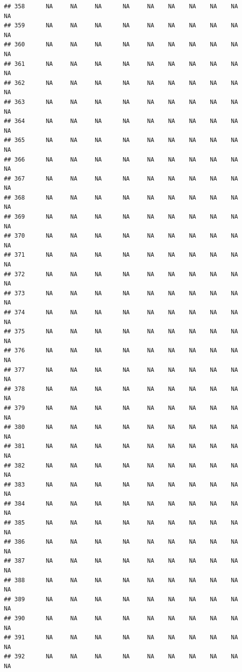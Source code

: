 \documentclass{article}\usepackage{graphicx, color}
\makeatletter
\newenvironment{kframe}{%
 \def\at@end@of@kframe{}%
 \ifinner\ifhmode%
  \def\at@end@of@kframe{\end{minipage}}%
  \begin{minipage}{\columnwidth}%
 \fi\fi%
 \def\FrameCommand##1{\hskip\@totalleftmargin \hskip-\fboxsep
 \colorbox{shadecolor}{##1}\hskip-\fboxsep
     \hskip-\linewidth \hskip-\@totalleftmargin \hskip\columnwidth}%
 \MakeFramed {\advance\hsize-\width
   \@totalleftmargin\z@ \linewidth\hsize
   \@setminipage}}%
 {\par\unskip\endMakeFramed%
 \at@end@of@kframe}
\newenvironment{knitrout}{}{} %
\makeatother
\begin{document}
\begin{knitrout}
\begin{kframe}
\begin{verbatim}
## 358      NA     NA     NA      NA     NA    NA    NA    NA    NA     NA
## 359      NA     NA     NA      NA     NA    NA    NA    NA    NA     NA
## 360      NA     NA     NA      NA     NA    NA    NA    NA    NA     NA
## 361      NA     NA     NA      NA     NA    NA    NA    NA    NA     NA
## 362      NA     NA     NA      NA     NA    NA    NA    NA    NA     NA
## 363      NA     NA     NA      NA     NA    NA    NA    NA    NA     NA
## 364      NA     NA     NA      NA     NA    NA    NA    NA    NA     NA
## 365      NA     NA     NA      NA     NA    NA    NA    NA    NA     NA
## 366      NA     NA     NA      NA     NA    NA    NA    NA    NA     NA
## 367      NA     NA     NA      NA     NA    NA    NA    NA    NA     NA
## 368      NA     NA     NA      NA     NA    NA    NA    NA    NA     NA
## 369      NA     NA     NA      NA     NA    NA    NA    NA    NA     NA
## 370      NA     NA     NA      NA     NA    NA    NA    NA    NA     NA
## 371      NA     NA     NA      NA     NA    NA    NA    NA    NA     NA
## 372      NA     NA     NA      NA     NA    NA    NA    NA    NA     NA
## 373      NA     NA     NA      NA     NA    NA    NA    NA    NA     NA
## 374      NA     NA     NA      NA     NA    NA    NA    NA    NA     NA
## 375      NA     NA     NA      NA     NA    NA    NA    NA    NA     NA
## 376      NA     NA     NA      NA     NA    NA    NA    NA    NA     NA
## 377      NA     NA     NA      NA     NA    NA    NA    NA    NA     NA
## 378      NA     NA     NA      NA     NA    NA    NA    NA    NA     NA
## 379      NA     NA     NA      NA     NA    NA    NA    NA    NA     NA
## 380      NA     NA     NA      NA     NA    NA    NA    NA    NA     NA
## 381      NA     NA     NA      NA     NA    NA    NA    NA    NA     NA
## 382      NA     NA     NA      NA     NA    NA    NA    NA    NA     NA
## 383      NA     NA     NA      NA     NA    NA    NA    NA    NA     NA
## 384      NA     NA     NA      NA     NA    NA    NA    NA    NA     NA
## 385      NA     NA     NA      NA     NA    NA    NA    NA    NA     NA
## 386      NA     NA     NA      NA     NA    NA    NA    NA    NA     NA
## 387      NA     NA     NA      NA     NA    NA    NA    NA    NA     NA
## 388      NA     NA     NA      NA     NA    NA    NA    NA    NA     NA
## 389      NA     NA     NA      NA     NA    NA    NA    NA    NA     NA
## 390      NA     NA     NA      NA     NA    NA    NA    NA    NA     NA
## 391      NA     NA     NA      NA     NA    NA    NA    NA    NA     NA
## 392      NA     NA     NA      NA     NA    NA    NA    NA    NA     NA

\end{verbatim}
\end{kframe}
\end{knitrout}
\end{document}
